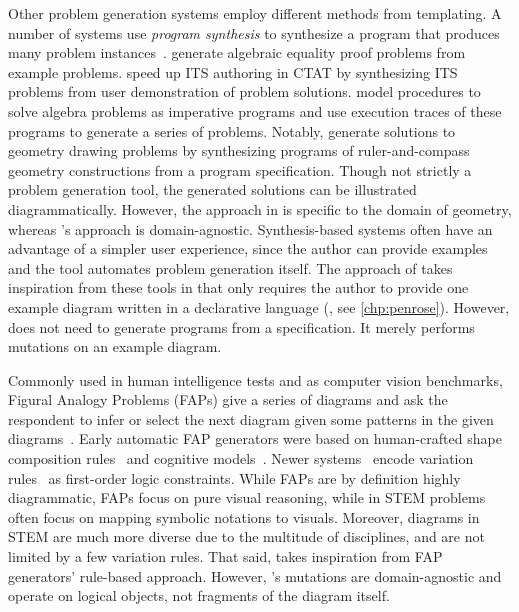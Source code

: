 Other problem generation systems employ different methods from templating. A number of systems use \emph{program synthesis} to synthesize a program that produces many problem instances~\cite{gulwani_example-based_2014}.  \citet{singh_automatically_2012} generate algebraic equality proof problems from example problems. \citet{machineTeaching} speed up ITS authoring in CTAT by synthesizing ITS problems from user demonstration of problem solutions. \citet{andersen_trace-based_2013} model procedures to solve algebra problems as imperative programs and use execution traces of these programs to generate a series of problems. Notably, \citet{gulwani_synthesizing_2011} generate solutions to geometry drawing problems by synthesizing programs of ruler-and-compass geometry constructions from a program specification. Though not strictly a problem generation tool, the generated solutions can be illustrated diagrammatically. However, the approach in \cite{gulwani_synthesizing_2011} is specific to the domain of geometry, whereas \Edgeworth's approach is domain-agnostic. Synthesis-based systems often have an advantage of a simpler user experience, since the author can provide examples and the tool automates problem generation itself. The approach of \Edgeworth takes inspiration from these tools in that \Edgeworth only requires the author to provide one example diagram written in a declarative language (\Substance, see \cref{chp:penrose}). However, \Edgeworth does not need to generate programs from a specification. It merely performs mutations on an example diagram. 

Commonly used in human intelligence tests and as computer vision benchmarks, Figural Analogy Problems (FAPs) give a series of diagrams and ask the respondent to infer or select the next diagram given some patterns in the given diagrams~\cite{yang_automatic_2022}. Early automatic FAP generators were based on human-crafted shape composition rules~\cite{hornke_rule-based_1986} and cognitive models~\cite{embretson_cognitive_1998}. Newer systems~\cite{wang_automatic_2015,pmlr-v80-barrett18a} encode variation rules~\cite{carpenter_what_1990} as first-order logic constraints. While FAPs are by definition highly diagrammatic, FAPs focus on pure visual reasoning, while in STEM problems often focus on mapping symbolic notations to visuals. Moreover, diagrams in STEM are much more diverse due to the multitude of disciplines, and are not limited by a few variation rules. That said, \Edgeworth takes inspiration from FAP generators' rule-based approach. However, \Edgeworth's mutations are domain-agnostic and operate on logical objects, not fragments of the diagram itself.

